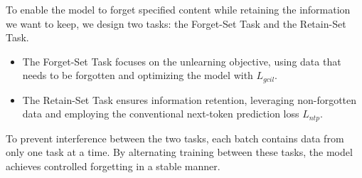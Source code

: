 \documentclass[11pt]{article}
\begin{document}


To enable the model to forget specified content while retaining the information we want to keep, we design two tasks: the Forget-Set Task and the Retain-Set Task.
\begin{itemize}
	\item The Forget-Set Task focuses on the unlearning objective, using data that needs to be forgotten and optimizing the model with $L_{gcil}$.
	\item The Retain-Set Task ensures information retention, leveraging non-forgotten data and employing the conventional next-token prediction loss $L_{ntp}$.
\end{itemize}


To prevent interference between the two tasks, each batch contains data from only one task at a time. By alternating training between these tasks, the model achieves controlled forgetting in a stable manner.
\end{document}
